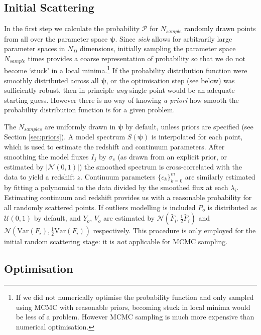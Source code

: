 \documentclass{aastex}
\newcommand{\sick}{\textit{sick}}
\begin{document}
\subsection{Initial Scattering}

In the first step we calculate the probability $\mathcal{P}$ for $N_{sample}$ randomly drawn points from all over the parameter space $\bm{\psi}$. Since \sick{} allows for arbitrarily large parameter spaces in $N_{D}$ dimensions, initially sampling the parameter space $N_{sample}$ times provides a coarse representation of probability so that we do not become `stuck' in a local minima.\footnote{If we did not numerically optimise the probability function and only sampled using MCMC with reasonable priors, becoming stuck in local minima would be less of a problem. However MCMC sampling is much more expensive than numerical optimisation.} If the probability distribution function were smoothly distributed across all $\bm{\psi}$, or the optimisation step (see below) was sufficiently robust, then in principle \textit{any} single point would be an adequate starting guess. However there is no way of knowing \textit{a priori} how smooth the probability distribution function is for a given problem. 

The $N_{samples}$ are uniformly drawn in $\bm{\psi}$ by default, unless priors are specified (see Section \ref{sec:priors}). A model spectrum $S(\bm{\psi})$ is interpolated for each point, which is used to estimate the redshift and continuum parameters. After smoothing the model fluxes $I_j$ by $\sigma_s$ (as drawn from an explicit prior, or estimated by $\left|\mathcal{N}\left(0, 1\right)\right|$) the smoothed spectrum is cross-correlated with the data to yield a redshift $z$. Continuum parameters $\{c_k\}_{k=0}^{m}$ are similarly estimated by fitting a polynomial to the data divided by the smoothed flux at each $\lambda_i$. Estimating continuum and redshift provides us with a reasonable probability for all randomly scattered points. If outliers modelling is included $P_o$ is distributed as $\mathcal{U}\left(0, 1\right)$ by default, and $Y_o$, $V_o$ are estimated by $\mathcal{N}\left(\widetilde{F_i}, \frac{1}{2}\widetilde{F_i}\right)$ and $\mathcal{N}\left(\mbox{Var}\left(F_i\right),\frac{1}{2}\mbox{Var}\left(F_i\right)\right)$ respectively. This procedure is only employed for the initial random scattering stage: it is \textit{not} applicable for MCMC sampling. 


\subsection{Optimisation}
\label{sec:optimise}
\end{document}
